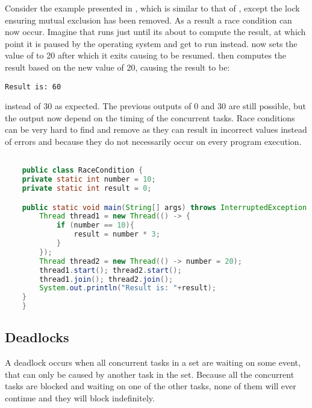 Consider the example presented in , which is similar to that of , except the lock ensuring mutual exclusion has been removed. As a result a race condition can now occur. Imagine that  runs just until its about to compute the result, at which point it is paused by the operating system and  get to run instead.  now sets the value of  to 20 after which it exits causing  to be resumed.  then computes the result based on the new  value of 20, causing the result to be:
\begin{verbatim}
Result is: 60
\end{verbatim}
instead of 30 as expected. The previous outputs of 0 and 30 are still possible, but the output now depend on the timing of the concurrent tasks. Race conditions can be very hard to find and remove as they can result in incorrect values instead of errors and because they do not necessarily occur on every program execution.
\begin{lstlisting}[float,label=lst:racecondition,
  caption={Race condition example},
  language=Java,  
  showspaces=false,
  showtabs=false,
  breaklines=true,
  showstringspaces=false,
  breakatwhitespace=true,
  commentstyle=\color{greencomments},
  keywordstyle=\color{bluekeywords},
  stringstyle=\color{redstrings}]  % Start your code-block

	public class RaceCondition {
    private static int number = 10;
    private static int result = 0;

    public static void main(String[] args) throws InterruptedException {
        Thread thread1 = new Thread(() -> {
            if (number == 10){
                result = number * 3;
            }
        });
        Thread thread2 = new Thread(() -> number = 20);
        thread1.start(); thread2.start();
        thread1.join(); thread2.join();
        System.out.println("Result is: "+result);
    }
	}
\end{lstlisting}
 
\subsection{Deadlocks}
A deadlock occurs when all concurrent tasks in a set are waiting on some event, that can only be caused by another task in the set\cite[p. 435]{tanenbaum2008modern}. Because all the concurrent tasks are blocked and waiting on one of the other tasks, none of them will ever continue and they will block indefinitely.

